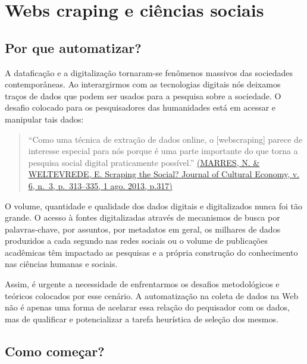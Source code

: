 \documentclass[
]{book}
\begin{document}
\hypertarget{webs-craping-e-ciuxeancias-sociais}{%
\chapter{Webs craping e ciências sociais}\label{webs-craping-e-ciuxeancias-sociais}}

\hypertarget{por-que-automatizar}{%
\section{Por que automatizar?}\label{por-que-automatizar}}

A dataficação e a digitalização tornaram-se fenômenos massivos das sociedades contemporâneas. Ao interargirmos com as tecnologias digitais nós deixamos traços de dados que podem ser usados para a pesquisa sobre a sociedade. O desafio colocado para os pesquisadores das humanidades está em acessar e manipular tais dados:

\begin{quote}
``Como uma técnica de extração de dados online, o {[}webscraping{]} parece de interesse especial para nós porque é uma parte importante do que torna a pesquisa social digital praticamente possível.'' \href{https://www.tandfonline.com/doi/abs/10.1080/17530350.2013.772070}{(MARRES, N. \& WELTEVREDE, E. Scraping the Social? Journal of Cultural Economy, v. 6, n.~3, p.~313--335, 1 ago. 2013, p.317)}
\end{quote}

O volume, quantidade e qualidade dos dados digitais e digitalizados nunca foi tão grande. O acesso à fontes digitalizadas através de mecanismos de busca por palavras-chave, por assuntos, por metadatos em geral, os milhares de dados produzidos a cada segundo nas redes sociais ou o volume de publicações acadêmicas têm impactado as pesquisas e a própria construção do conhecimento nas ciências humanas e sociais.

Assim, é urgente a necessidade de enfrentarmos os desafios metodológicos e teóricos colocados por esse cenário. A automatização na coleta de dados na Web não é apenas uma forma de acelarar essa relação do pequisador com os dados, mas de qualificar e potencializar a tarefa heurística de seleção dos mesmos.

\hypertarget{como-comeuxe7ar}{%
\section{Como começar?}\label{como-comeuxe7ar}}
\end{document}
